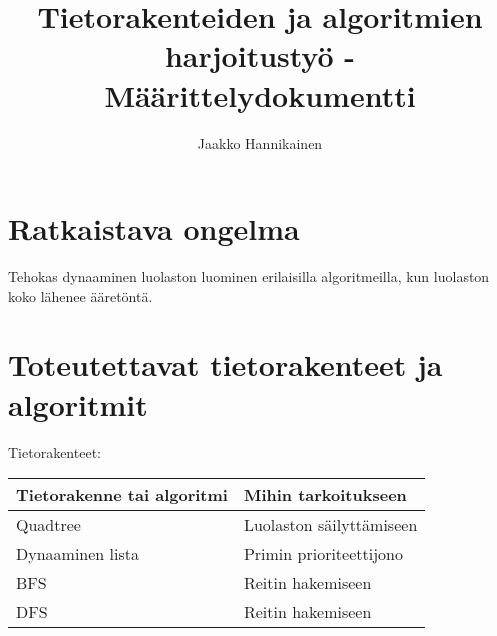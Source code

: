 \documentclass{article}
\author{Jaakko Hannikainen}
\title{Tietorakenteiden ja algoritmien harjoitustyö - Määrittelydokumentti}
\begin{document}
\maketitle

\section{Ratkaistava ongelma}
Tehokas dynaaminen luolaston luominen erilaisilla algoritmeilla, kun luolaston
koko lähenee ääretöntä.

\section{Toteutettavat tietorakenteet ja algoritmit}
Tietorakenteet:

\begin{table}[h]
\begin{tabular}{| l | l |}
\hline
\rowcolor{Gray}
Tietorakenne tai algoritmi & Mihin tarkoitukseen      \\ \hline
Quadtree                   & Luolaston säilyttämiseen \\ \hline
Dynaaminen lista           & Primin prioriteettijono  \\ \hline
BFS                        & Reitin hakemiseen        \\ \hline
DFS                        & Reitin hakemiseen        \\ \hline
\end{tabular}
\end{table}
\end{document}
